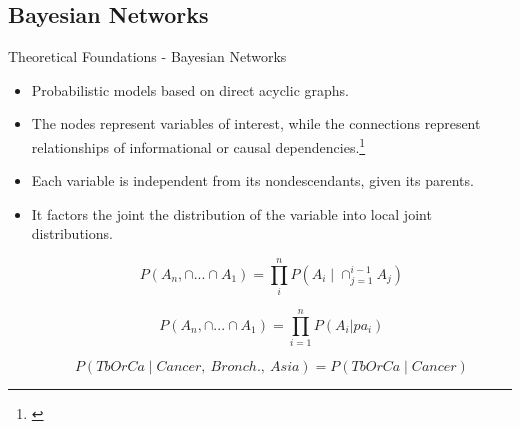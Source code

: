 \subsection{Bayesian Networks}
\begin{frame}{Theoretical Foundations - Bayesian Networks}

    \begin{itemize}
        \item Probabilistic models based on direct acyclic graphs.
        \item The nodes represent variables of interest, while the connections represent relationships of informational or causal dependencies.\footnote{\cite{pearl2011bayesian}}
        \item Each variable is independent from its nondescendants, given its parents.
    \end{itemize}
\end{frame}

\begin{frame}
    \begin{itemize}
        \item {It factors the joint the distribution of the variable into local joint distributions.
        
        \begin{equation}
            P(A_n,\cap ... \cap A_1) = \prod_i^n P(A_i \mid \cap_{j=1}^{i-1}A_j)           
            \label{eq:bayes}
        \end{equation}

        \begin{equation}
            P(A_n,\cap ...\cap A_1) = \prod_{i=1}^n P(A_i|pa_i)
            \label{eq:compact_joint}
        \end{equation}

        \begin{equation}
             P(TbOrCa\mid Cancer,\ Bronch.,\ Asia) = P(TbOrCa \mid Cancer)
            \label{eq:ind_cond}
        \end{equation} 
        }
    \end{itemize}
\end{frame}

